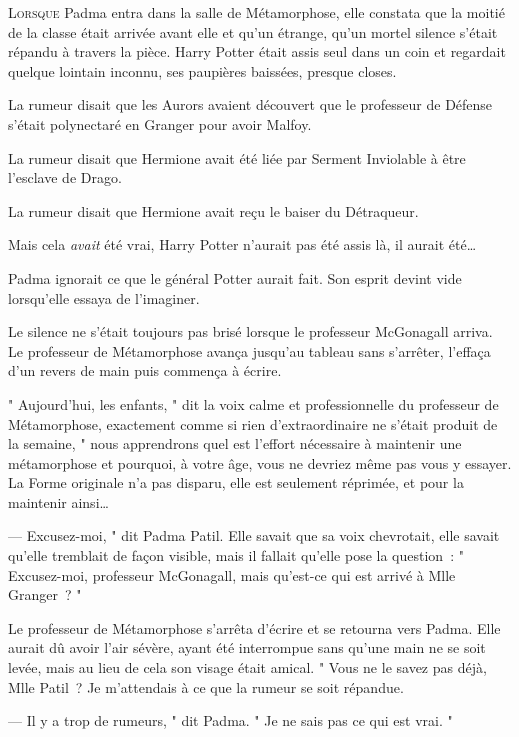 
\lettrine{L}{orsque}  Padma entra dans la salle de Métamorphose, elle constata que la moitié de la classe était arrivée avant elle et qu'un étrange, qu'un mortel silence s'était répandu à travers la pièce. Harry Potter était assis seul dans un coin et regardait quelque lointain inconnu, ses paupières baissées, presque closes.

La rumeur disait que les Aurors avaient découvert que le professeur de Défense s'était polynectaré en Granger pour avoir Malfoy.

La rumeur disait que Hermione avait été liée par Serment Inviolable à être l'esclave de Drago.

La rumeur disait que Hermione avait reçu le baiser du Détraqueur.

Mais cela \emph{avait} été vrai, Harry Potter n'aurait pas été assis là, il aurait été…

Padma ignorait ce que le général Potter aurait fait. Son esprit devint vide lorsqu'elle essaya de l'imaginer.

Le silence ne s'était toujours pas brisé lorsque le professeur McGonagall arriva. Le professeur de Métamorphose avança jusqu'au tableau sans s'arrêter, l'effaça d'un revers de main puis commença à écrire.

" Aujourd'hui, les enfants, " dit la voix calme et professionnelle du professeur de Métamorphose, exactement comme si rien d'extraordinaire ne s'était produit de la semaine, " nous apprendrons quel est l'effort nécessaire à maintenir une métamorphose et pourquoi, à votre âge, vous ne devriez même pas vous y essayer. La Forme originale n'a pas disparu, elle est seulement réprimée, et pour la maintenir ainsi… 

---  Excusez-moi, " dit Padma Patil. Elle savait que sa voix chevrotait, elle savait qu'elle tremblait de façon visible, mais il fallait qu'elle pose la question~: " Excusez-moi, professeur McGonagall, mais qu'est-ce qui est arrivé à Mlle Granger~? "

Le professeur de Métamorphose s'arrêta d'écrire et se retourna vers Padma. Elle aurait dû avoir l'air sévère, ayant été interrompue sans qu'une main ne se soit levée, mais au lieu de cela son visage était amical. " Vous ne le savez pas déjà, Mlle Patil~? Je m'attendais à ce que la rumeur se soit répandue. 

---  Il y a trop de rumeurs, " dit Padma. " Je ne sais pas ce qui est vrai. "

